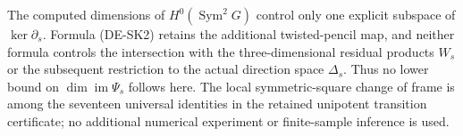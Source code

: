 \begin{remark}
\label{rem:DE-A3-symmetric-boundary-kernel-scope}
The computed dimensions of $H^0(\operatorname{Sym}^2G)$ control only
one explicit subspace of $\ker\partial_s$. Formula (DE-SK2) retains
the additional twisted-pencil map, and neither formula controls the
intersection with the three-dimensional residual products $W_s$ or
the subsequent restriction to the actual direction space $\Delta_s$.
Thus no lower bound on $\dim\operatorname{im}\Psi_s$ follows here.
The local symmetric-square change of frame is among the seventeen
universal identities in the retained unipotent transition certificate;
no additional numerical experiment or finite-sample inference is used.
\end{remark}
